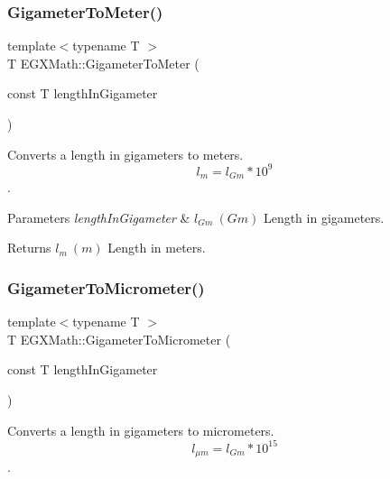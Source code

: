 \subsubsection{\texorpdfstring{Gigameter\+To\+Meter()}{GigameterToMeter()}}
{\footnotesize\ttfamily template$<$typename T $>$ \\
T E\+G\+X\+Math\+::\+Gigameter\+To\+Meter (\begin{DoxyParamCaption}\item[{const T}]{length\+In\+Gigameter }\end{DoxyParamCaption})}



Converts a length in gigameters to meters. \[ l_{m}=l_{Gm} * 10^{9}\]. 


\begin{DoxyParams}{Parameters}
{\em length\+In\+Gigameter} & $ l_{Gm}\ (Gm)$ Length in gigameters. \\
\hline
\end{DoxyParams}
\begin{DoxyReturn}{Returns}
$ l_{m}\ (m)$ Length in meters. 
\end{DoxyReturn}
\mbox{\label{group___e_g_x_math-_conversions-_length_conversions-_s_i-_gigameter-_s_i_ga02f73d15581b1cd69a79b843186211f5}} 
\subsubsection{\texorpdfstring{Gigameter\+To\+Micrometer()}{GigameterToMicrometer()}}
{\footnotesize\ttfamily template$<$typename T $>$ \\
T E\+G\+X\+Math\+::\+Gigameter\+To\+Micrometer (\begin{DoxyParamCaption}\item[{const T}]{length\+In\+Gigameter }\end{DoxyParamCaption})}



Converts a length in gigameters to micrometers. \[ l_{\mu m}=l_{Gm} * 10^{15} \]. 

